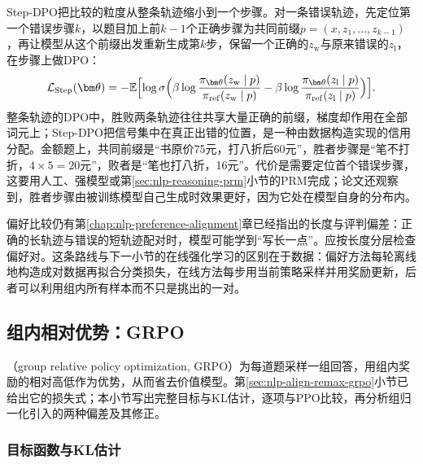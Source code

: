 Step-DPO把比较的粒度从整条轨迹缩小到一个步骤。对一条错误轨迹，先定位第一个错误步骤$k$，以题目加上前$k-1$个正确步骤为共同前缀$p=(x,z_1,\ldots,z_{k-1})$，再让模型从这个前缀出发重新生成第$k$步，保留一个正确的$z_{\mathrm w}$与原来错误的$z_{\mathrm l}$，在步骤上做DPO：
\begin{equation}
  \mathcal L_{\mathrm{Step}}(\bm\theta)=-\mathbb E\Bigl[\log\sigma\Bigl(\beta\log\frac{\pi_{\bm\theta}(z_{\mathrm w}\mid p)}{\pi_{\mathrm{ref}}(z_{\mathrm w}\mid p)}-\beta\log\frac{\pi_{\bm\theta}(z_{\mathrm l}\mid p)}{\pi_{\mathrm{ref}}(z_{\mathrm l}\mid p)}\Bigr)\Bigr].
  \label{eq:nlp-reasoning-step-dpo}
\end{equation}
整条轨迹的DPO中，胜败两条轨迹往往共享大量正确的前缀，梯度却作用在全部词元上；Step-DPO把信号集中在真正出错的位置，是一种由数据构造实现的信用分配。金额题上，共同前缀是“书原价75元，打八折后60元”，胜者步骤是“笔不打折，$4\times5=20$元”，败者是“笔也打八折，16元”。代价是需要定位首个错误步骤，这要用人工、强模型或第\ref{sec:nlp-reasoning-prm}小节的PRM完成；论文还观察到，胜者步骤由被训练模型自己生成时效果更好，因为它处在模型自身的分布内。

偏好比较仍有第\ref{chap:nlp-preference-alignment}章已经指出的长度与评判偏差：正确的长轨迹与错误的短轨迹配对时，模型可能学到“写长一点”。应按长度分层检查偏好对。这条路线与下一小节的在线强化学习的区别在于数据：偏好方法每轮离线地构造成对数据再拟合分类损失，在线方法每步用当前策略采样并用奖励更新，后者可以利用组内所有样本而不只是挑出的一对。

\subsection{组内相对优势：GRPO}
\label{sec:nlp-reasoning-grpo}

（group relative policy optimization, GRPO）为每道题采样一组回答，用组内奖励的相对高低作为优势，从而省去价值模型。第\ref{sec:nlp-align-remax-grpo}小节已给出它的损失式；本小节写出完整目标与KL估计，逐项与PPO比较，再分析组归一化引入的两种偏差及其修正。

\subsubsection{目标函数与KL估计}
\label{sec:nlp-reasoning-grpo-objective}

